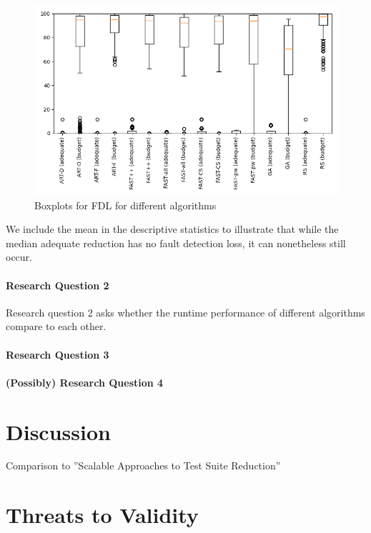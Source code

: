 \begin{figure}[h]
\caption[FDL boxplots]{Boxplots for FDL for different algorithms}\label{fig:fdl_box}
\centering
\includegraphics[scale=0.7]{figures/fdls.png}
\end{figure}

We include the mean in the descriptive statistics to illustrate that
while the median adequate reduction has no fault detection loss, it can
nonetheless still occur.

\paragraph{Research Question 2}

Research question 2 asks whether the runtime performance of different
algorithms compare to each other.

\paragraph{Research Question 3}

\paragraph{(Possibly) Research Question 4}

\section{Discussion}

Comparison to ''Scalable Approaches to Test Suite Reduction''

\section{Threats to Validity}

